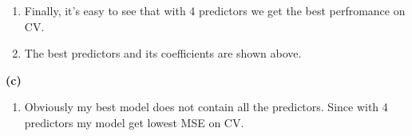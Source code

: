 \documentclass[a4paper]{article}
\renewcommand{\part}[1] {\vspace{.10in} {\bf (#1)}}
\begin{document}
{\color{red}
\begin{enumerate}
\item Finally, it's easy to see that with 4 predictors we get the best perfromance on CV.
\item The best predictors and its coefficients are shown above.
\end{enumerate}
}

\part{c}
{\color{red}
\begin{enumerate}
\item Obviously my best model does not contain all the predictors. Since with 4 predictors my model get lowest MSE on CV.
\end{enumerate}
}
\end{document}

